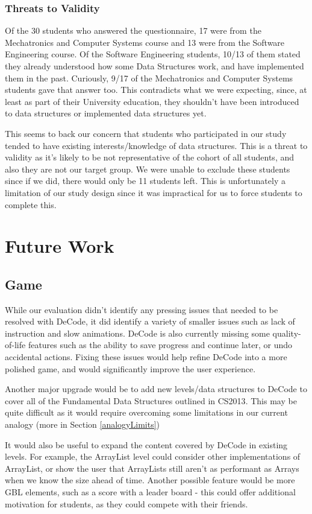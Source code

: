 \documentclass[10pt]{article}
\begin{document}
\subsubsection{Threats to Validity}
\label{studycohort}
Of the 30 students who answered the questionnaire, 17 were from the Mechatronics and Computer Systems course and 13 were from the Software Engineering course. Of the Software Engineering students, 10/13 of them stated they already understood how some Data Structures work, and have implemented them in the past. Curiously, 9/17 of the Mechatronics and Computer Systems students gave that answer too. This contradicts what we were expecting, since, at least as part of their University education, they shouldn't have been introduced to data structures or implemented data structures yet.\par
This seems to back our concern that students who participated in our study tended to have existing interests/knowledge of data structures. This is a threat to validity as it's likely to be not representative of the cohort of all students, and also they are not our target group. We were unable to exclude these students since if we did, there would only be 11 students left. This is unfortunately a limitation of our study design since it was impractical for us to force students to complete this.
\section{Future Work}
\subsection{Game}
While our evaluation didn't identify any pressing issues that needed to be resolved with DeCode, it did identify a variety of smaller issues such as lack of instruction and slow animations. DeCode is also currently missing some quality-of-life features such as the ability to save progress and continue later, or undo accidental actions. Fixing these issues would help refine DeCode into a more polished game, and would significantly improve the user experience. \par
Another major upgrade would be to add new levels/data structures to DeCode to cover all of the Fundamental Data Structures outlined in CS2013\cite{CS2013}. This may be quite difficult as it would require overcoming some limitations in our current analogy (more in Section \ref{analogyLimits})\par
It would also be useful to expand the content covered by DeCode in existing levels. For example, the ArrayList level could consider other implementations of ArrayList, or show the user that ArrayLists still aren't as performant as Arrays when we know the size ahead of time. Another possible feature would be more GBL elements, such as a score with a leader board - this could offer additional motivation for students, as they could compete with their friends.
\end{document}
